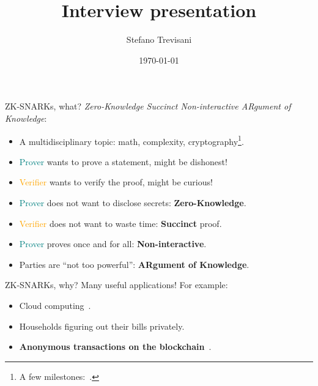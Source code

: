 \documentclass{beamer}
\title{Interview presentation}
\date{\today}
\author{Stefano Trevisani}
\institute{Università degli Studi di Udine \and Alpen Adria Universit\"{a}t Klagenfurt}
\begin{document}
\maketitle

\begin{frame}{ZK-SNARKs, what?}
  \emph{Zero-Knowledge Succinct Non-interactive ARgument of Knowledge}:
  \begin{itemize}
    \item A multidisciplinary topic: math, complexity, cryptography\footnote{
      A few milestones:~\cite{GoldwasserMR1989,Shamir1992,Damgard1993,Micali2000,GennaroGPR2012,Groth2016}.
    }. 
    \item \textcolor{teal}{Prover} wants to prove a statement, might be dishonest!
    \item \textcolor{orange}{Verifier} wants to verify the proof, might be curious!
    \item \textcolor{teal}{Prover} does not want to disclose secrets: \textbf{Zero-Knowledge}.
    \item \textcolor{orange}{Verifier} does not want to waste time: \textbf{Succinct} proof.
    \item \textcolor{teal}{Prover} proves once and for all: \textbf{Non-interactive}.
    \item Parties are ``not too powerful'': \textbf{ARgument of Knowledge}.
  \end{itemize}
\end{frame}

\begin{frame}{ZK-SNARKs, why?}
  Many useful applications! For example:
  \begin{itemize}
    \item Cloud computing~\cite{ParnoGHR2013}.
    \item Households figuring out their bills privately.
    \item \textbf{Anonymous transactions on the blockchain}~\cite{SassonCGGMTV2014}.
  \end{itemize}
\end{frame}
\end{document}
